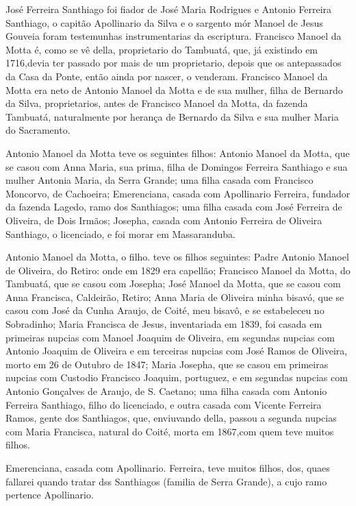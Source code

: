José Ferreira Santhiago foi fiador de José Maria Rodrigues e Antonio Ferreira Santhiago, o capitão Apollinario da Silva e o sargento mór Manoel de Jesus Gouveia foram testemunhas instrumentarias da escriptura. Francisco Manoel da Motta é, como se vê della, proprietario do Tambuatá, que, já existindo em 1716,devia ter passado por mais de um proprietario, depois que os antepassados da Casa da Ponte, então ainda por nascer, o venderam. Francisco Manoel da Motta era neto de Antonio Manoel
da Motta e de sua mulher, filha de Bernardo da Silva, proprietarios, antes de Francisco Manoel da Motta, da fazenda Tambuatá, naturalmente por herança de Bernardo da Silva e sua mulher Maria do Sacramento.

Antonio Manoel da Motta teve os seguintes filhos: Antonio Manoel da Motta, que se casou com Anna Maria, sua prima, filha de Domingos Ferreira Santhiago e sua mulher Antonia Maria, da Serra Grande; uma filha casada com Francisco Moncorvo, de Cachoeira; Emerenciana, casada com Apollinario Ferreira, fundador da fazenda Lagedo, ramo dos Santhiagos; uma filha casada com José Ferreira de Oliveira, de Dois Irmãos; Josepha, casada com Antonio Ferreira de Oliveira Santhiago, o licenciado, e foi morar em Massaranduba.


Antonio Manoel da Motta, o filho. teve os filhos seguintes: Padre Antonio Manoel de Oliveira, do Retiro: onde em 1829 era capellão; Francisco Manoel da Motta, do Tambuatá, que se casou com Josepha; José Manoel da Motta, que se casou com Anna Francisca, Caldeirão, Retiro; Anna Maria de Oliveira minha bisavó, que se casou com José da Cunha Araujo, de Coité, meu bisavô, e se estabeleceu no Sobradinho; Maria Francisca de Jesus, inventariada em 1839, foi casada em primeiras nupcias com Manoel Joaquim de Oliveira, em segundas nupcias com Antonio Joaquim de Oliveira e em terceiras nupcias com José Ramos de Oliveira, morto em 26 de Outubro de 1847; Maria Josepha, que se casou em primeiras nupcias com Custodio Francisco Joaquim, portuguez, e em segundas nupcias com Antonio Gonçalves de Araujo, de S. Caetano; uma filha casada com Antonio Ferreira Santhiago, filho do licenciado, e outra casada com Vicente Ferreira Ramos, gente dos Santhiagos, que, enviuvando della, passou a segunda nupcias com Maria Francisca, natural do Coité, morta em 1867,com quem teve muitos filhos.

Emerenciana, casada com Apollinario. Ferreira, teve muitos filhos, dos, quaes fallarei quando tratar dss Santhiagos (familia de Serra Grande), a cujo ramo pertence Apollinario.

